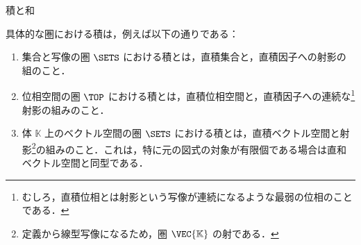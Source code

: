 \documentclass[TQFT_main]{subfiles}
\begin{document}
\begin{myexample}[label=def:product-coproduct]{積と和}
\begin{center}
\begin{tikzcd}
        \end{tikzcd}
    \end{center}
    具体的な圏における積は，例えば以下の通りである：
    \begin{enumerate}
        \item 集合と写像の圏 $\SETS$ における積とは，直積集合と，直積因子への射影の組のこと．
        \item 位相空間の圏 $\TOP$ における積とは，直積位相空間と，直積因子への連続な\footnote{むしろ，直積位相とは射影という写像が連続になるような最弱の位相のことである．}射影の組みのこと．
        \item 体 $\mathbb{K}$ 上のベクトル空間の圏 $\SETS$ における積とは，直積ベクトル空間と射影\footnote{定義から線型写像になるため，圏 $\VEC{\mathbb{K}}$ の射である．}の組みのこと．これは，特に元の図式の対象が有限個である場合は直和ベクトル空間と同型である．
    \end{enumerate}
    

\end{myexample}
\end{document}
